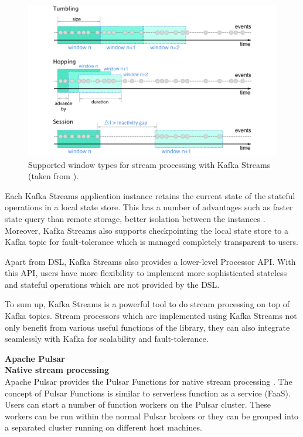 \begin{figure}[h]
	\centering
	\includegraphics[width=\linewidth]{images/window-types.png}
	\caption{Supported window types for stream processing with Kafka Streams (taken from \cite{windowtypes}).}
	\label{fig:windowtypes}
\end{figure}

Each Kafka Streams application instance retains the current state of the stateful operations in a local state store. This has a number of advantages such as faster state query than remote storage, better isolation between the instances \cite{localstatestore}. Moreover, Kafka Streams also supports checkpointing the local state store to a Kafka topic for fault-tolerance which is managed completely transparent to users.

Apart from DSL, Kafka Streams also provides a lower-level Processor API. With this API, users have more flexibility to implement more sophisticated stateless and stateful operations which are not provided by the DSL. 

To sum up, Kafka Streams is a powerful tool to do stream processing on top of Kafka topics. Stream processors which are implemented using Kafka Streams not only benefit from various useful functions of the library, they can also integrate seamlessly with Kafka for scalability and fault-tolerance.





\large \textbf{Apache Pulsar}\\
\normalsize
\textbf{Native stream processing}\\
Apache Pulsar provides the Pulsar Functions for native stream processing \cite{pulsarfunction}. The concept of Pulsar Functions is similar to serverless function as a service (FaaS). Users can start a number of function workers on the Pulsar cluster. These workers can be run within the normal Pulsar brokers or they can be grouped into a separated cluster running on different host machines. 

